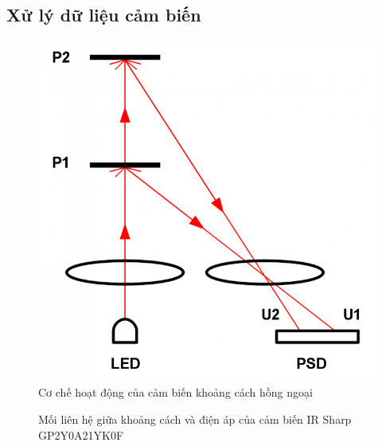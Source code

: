 \subsection{Xử lý dữ liệu cảm biến}

\begin{figure}[htbp]
    \centering
    \includegraphics[width=0.5\linewidth]{figures/sensor_ir_distance_principle.png}
    \caption{Cơ chế hoạt động của cảm biến khoảng cách hồng ngoại \cite{Heikopikner2015}}
    \label{fig:sensor_ir_distance_principle}
\end{figure}

\begin{figure}[htbp]
    \centering
    \caption{Mối liên hệ giữa khoảng cách và điện áp của cảm biến IR Sharp GP2Y0A21YK0F \cite{irdatasheet}}
    \label{fig:irSharp-vol-distance}
\end{figure}

